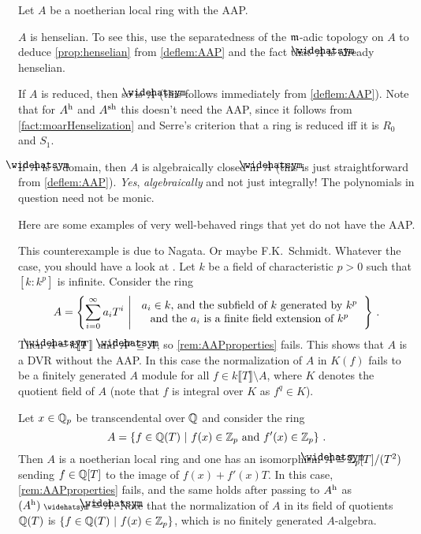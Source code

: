 \begin{rem}\label{rem:AAPproperties}
	Let $A$ be a noetherian local ring with the AAP.
	\begin{alphanumerate}
		\item $A$ is henselian. To see this, use the separatedness of the $\mathfrak{m}$-adic topology on $A$ to deduce \cref{prop:henselian} from \cref{deflem:AAP} and the fact that $\roof{A}$ is already henselian.
		\item If $A$ is reduced, then so is $\roof{A}$ (this follows immediately from \cref{deflem:AAP}). Note that for $A^{\mathrm{h}}$ and $A^{\mathrm{sh}}$ this doesn't need the AAP, since it follows from \cref{fact:moarHenselization} and Serre's criterion that a ring is reduced iff it is $R_0$ and $S_1$.
		\item If $\roof{A}$ is a domain, then $A$ is algebraically closed in $\roof{A}$ (this is just straightforward from \cref{deflem:AAP}). \emph{Yes}, \emph{algebraically} and not just integrally! The polynomials in question need not be monic.
	\end{alphanumerate}
\end{rem}
\begin{exm}
	Here are some examples of very well-behaved rings that yet do not have the AAP.
	\begin{alphanumerate}
		\item This counterexample is due to Nagata. Or maybe F.K.\ Schmidt. Whatever the case, you should have a look at \cite{BGR}. Let $k$ be a field of characteristic $p>0$ such that $[k:k^p]$ is infinite. Consider the ring
		\begin{equation*}
			A=\left\{\sum_{i=0}^\infty a_iT^i\st
			\begin{tabular}{c}
				$a_i\in k$, and the subfield of $k$ generated by $k^p$\\
				and the $a_i$ is a finite field extension of $k^p$
			\end{tabular}\right\}\,.
		\end{equation*}
		Then $\roof{A}=k\llbracket T\rrbracket$ and $\roof{A}^p\subseteq A$, so \cref{rem:AAPproperties} fails. This shows that $A$ is a DVR without the AAP. In this case the normalization of $A$ in $K(f)$ fails to be a finitely generated $A$ module for all $f\in k\llbracket T\rrbracket\setminus A$, where $K$ denotes the quotient field of $A$ (note that $f$ is integral over $K$ as $f^q\in K$).
		\item Let $x\in \mathbb{Q}_p$ be transcendental over $\mathbb{Q}$ and consider the ring
		\begin{equation*}
			A=\left\{f\in\mathbb{Q}(T)\ \middle|\  f(x)\in\mathbb{Z}_p\text{ and }f'(x)\in\mathbb{Z}_p\right\}\,.
		\end{equation*}
		Then $A$ is a noetherian local ring and one has an isomorphism $\roof{A}\cong \IZ_p[T]/(T^2)$ sending $f\in \mathbb{Q}[T]$ to the image of $f(x)+f'(x)T$. In this case, \cref{rem:AAPproperties} fails, and the same holds after passing to $A^{\mathrm{h}}$ as $(A^\h)^\complete\cong \roof{A}$. Note that the normalization of $A$ in its field of quotients $\mathbb{Q}(T)$ is $\left\{f\in\mathbb{Q}(T)\ \middle|\  f(x)\in\mathbb{Z}_p\right\}$, which is no finitely generated $A$-algebra.
	\end{alphanumerate}
\end{exm}
